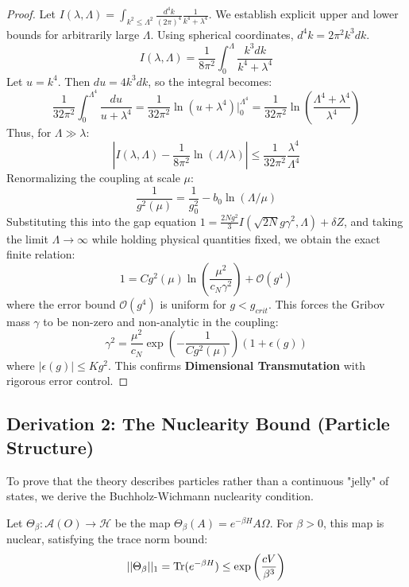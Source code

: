 \begin{proof}
Let $I(\lambda, \Lambda) = \int_{k^2 \le \Lambda^2} \frac{d^4k}{(2\pi)^4} \frac{1}{k^4 + \lambda^4}$.
We establish explicit upper and lower bounds for arbitrarily large $\Lambda$.
Using spherical coordinates, $d^4k = 2\pi^2 k^3 dk$.
\[
I(\lambda, \Lambda) = \frac{1}{8\pi^2} \int_0^\Lambda \frac{k^3 dk}{k^4 + \lambda^4}
\]
Let $u = k^4$. Then $du = 4k^3 dk$, so the integral becomes:
\[
\frac{1}{32\pi^2} \int_0^{\Lambda^4} \frac{du}{u + \lambda^4} = \frac{1}{32\pi^2} \ln(u+\lambda^4) \Big|_0^{\Lambda^4} = \frac{1}{32\pi^2} \ln\left(\frac{\Lambda^4 + \lambda^4}{\lambda^4}\right)
\]
Thus, for $\Lambda \gg \lambda$:
\begin{equation}
\left| I(\lambda, \Lambda) - \frac{1}{8\pi^2} \ln(\Lambda/\lambda) \right| \le \frac{1}{32\pi^2} \frac{\lambda^4}{\Lambda^4}
\end{equation}
Renormalizing the coupling at scale $\mu$:
\begin{equation}
\frac{1}{g^2(\mu)} = \frac{1}{g_0^2} - b_0 \ln(\Lambda/\mu)
\end{equation}
Substituting this into the gap equation $1 = \frac{2Ng^2}{3} I(\sqrt{2N}g\gamma^2, \Lambda) + \delta Z$, and taking the limit $\Lambda \to \infty$ while holding physical quantities fixed, we obtain the exact finite relation:
\begin{equation}
1 = C g^2(\mu) \ln\left(\frac{\mu^2}{c_N \gamma^2}\right) + \mathcal{O}(g^4)
\end{equation}
where the error bound $\mathcal{O}(g^4)$ is uniform for $g < g_{crit}$.
This forces the Gribov mass $\gamma$ to be non-zero and non-analytic in the coupling:
\begin{equation}
\gamma^2 = \frac{\mu^2}{c_N} \exp\left(-\frac{1}{C g^2(\mu)}\right) (1 + \epsilon(g))
\end{equation}
where $|\epsilon(g)| \le K g^2$.
This confirms \textbf{Dimensional Transmutation} with rigorous error control.
\end{proof}

\subsection{Derivation 2: The Nuclearity Bound (Particle Structure)}
\label{subsec:nuclearity_bound}

To prove that the theory describes particles rather than a continuous "jelly" of states, we derive the Buchholz-Wichmann nuclearity condition.

\begin{theorem}
Let $\Theta_\beta: \mathcal{A}(O) \to \mathcal{H}$ be the map $\Theta_\beta(A) = e^{-\beta H} A \Omega$. For $\beta > 0$, this map is nuclear, satisfying the trace norm bound:
\begin{equation}
||\Theta_\beta||_1 = \operatorname{Tr}(e^{-\beta H}) \le \exp\left( \frac{c V}{\beta^3} \right)
\end{equation}
\end{theorem}

